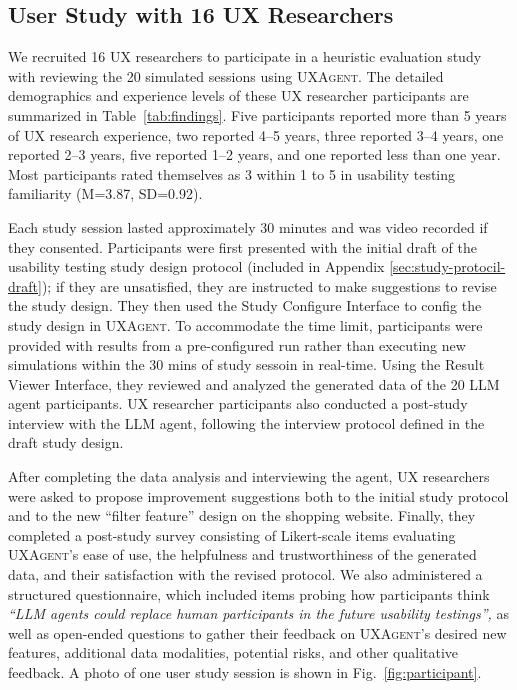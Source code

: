 \documentclass[manuscript,review,anonymous]{acmart}
\DeclareRobustCommand{\projectname}{\textsc{UXAgent}\xspace}
\begin{document}
\subsection{User Study with 16 UX Researchers}
\label{sec:study-protocol}

We recruited 16 UX researchers to participate in a heuristic evaluation study with reviewing the 20 simulated sessions using \projectname. 
The detailed demographics and experience levels of these UX researcher participants are summarized in Table~\ref{tab:findings}. Five participants reported more than 5 years of UX research experience, two reported 4--5 years, three reported 3--4 years, one reported 2--3 years, five reported 1--2 years, and one reported less than one year. Most participants rated themselves as 3 within 1 to 5 in usability testing familiarity (M=3.87, SD=0.92).

Each study session lasted approximately 30 minutes and was video recorded if they consented. Participants were first presented with the initial draft of the usability testing study design protocol (included in Appendix \ref{sec:study-protocil-draft}); if they are unsatisfied, they are instructed to make suggestions to revise the study design. 
They then used the Study Configure Interface  to config the study design in \projectname. 
To accommodate the time limit, participants were provided with results from a pre-configured run rather than executing new simulations within the 30 mins of study sessoin in real-time. 
Using the Result Viewer Interface, they reviewed and analyzed the generated data of the 20 LLM agent participants. 
UX researcher participants also conducted a post-study interview with the LLM agent, following the interview protocol defined in the draft study design. 

After completing the data analysis and interviewing the agent, UX researchers were asked to propose improvement suggestions both to the initial study protocol and to the new ``filter feature'' design on the shopping website. 
Finally, they completed a post-study survey consisting of Likert-scale items evaluating \projectname's ease of use, the helpfulness and trustworthiness of the generated data, and their satisfaction with the revised protocol. 
We also administered a structured questionnaire, which included items probing how participants think \textit{``LLM agents could replace human participants in the future usability testings'',} as well as open-ended questions to gather their feedback on \projectname's desired new features, additional data modalities, potential risks, and other qualitative feedback. A photo of one user study session is shown in Fig.~\ref{fig:participant}.
\end{document}

